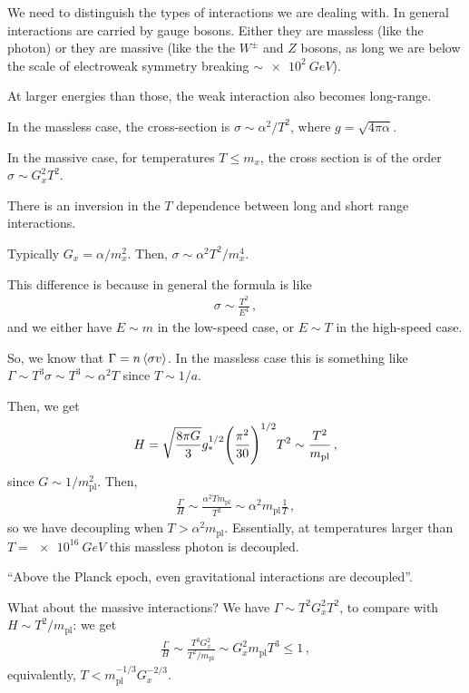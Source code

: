 \documentclass[main.tex]{subfiles}
\begin{document}
We need to distinguish the types of interactions we are dealing with.
In general interactions are carried by gauge bosons. 
Either they are massless (like the photon) or they are massive (like the the \(W^{\pm}\) and \(Z\) bosons, as long we are below the scale of electroweak symmetry breaking \(\sim \SI{e2}{GeV}\)).

At larger energies than those, the weak interaction also becomes long-range.

In the massless case, the cross-section is \(\sigma \sim \alpha^2 / T^2\), where \(g = \sqrt{4 \pi \alpha }\).

In the massive case, for temperatures \(T \leq m_{x}\), the cross section is of the order \(\sigma \sim G_x^2 T^2\).

There is an inversion in the \(T\) dependence between long and short range interactions.

Typically \(G_x = \alpha / m_x^2\).  Then, \(\sigma \sim \alpha^2 T^2 / m_x^{4}\).

This difference is because in general the formula is like 
%
\begin{align}
  \sigma \sim \frac{T^{2}}{E^{4}}
\,,
\end{align}
%
and we either have \(E \sim m\) in the low-speed case, or \(E \sim T\) in the high-speed case.

So, we know that \(\Gamma = n \expval{\sigma v}\). In the massless case this is something like \(\Gamma \sim T^3 \sigma \sim T^{3} \sim \alpha^2 T\) since \(T \sim 1/ a\).

Then, we get 
%
\begin{align}
  H = \sqrt{\frac{8 \pi G }{3}} g_{*}^{1/2} \qty(\frac{\pi^2}{30})^{1/2} T^2 \sim \frac{T^2}{m _{\text{pl}}}
\,,
\end{align}
%
since \(G \sim 1/m _{\text{pl}}^2\). Then, 
%
\begin{align}
  \frac{\Gamma}{H} \sim \frac{\alpha^2 T m _{\text{pl}}}{T^2} \sim \alpha^2 m _{\text{pl}} \frac{1}{T}
\,,
\end{align}
%
so we have decoupling when \(T > \alpha^2 m _{\text{pl}}\).
Essentially, at temperatures larger than \(T = \SI{e16}{GeV}\) this massless photon is decoupled.

``Above the Planck epoch, even gravitational interactions are decoupled''.

What about the massive interactions? We have \(\Gamma \sim T^2 G_x^2 T^2\), to compare with \(H \sim T^2/ m _{\text{pl}}\): we get 
%
\begin{align}
  \frac{\Gamma}{H} \sim \frac{T^3 G_x^2}{T^2 / m _{\text{pl}}} \sim G_x^2 m _{\text{pl}} T^3 \leq 1
\,,
\end{align}
%
equivalently, \(T < m _{\text{pl}}^{-1/3} G_x^{-2/3}\).
\end{document}
